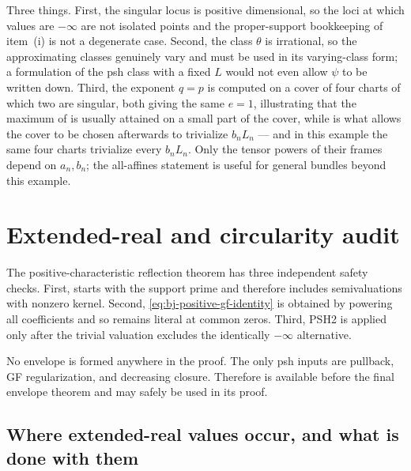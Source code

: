 \begin{remark}
\label{rem:ch43-surface-adds}
Three things.  First, the singular locus is positive dimensional, so the
loci at which values are $-\infty$ are not isolated points and the
proper-support bookkeeping of item~(i) is not a degenerate case.  Second,
the class $\theta$ is irrational, so the approximating classes genuinely
vary and  must be used in its varying-class form; a
formulation of the psh class with a fixed $L$ would not even allow
$\psi$ to be written down.  Third, the exponent $q=p$ is computed on a
cover of four charts of which two are singular, both giving the same
$e=1$, illustrating that the
maximum of  is usually attained on a small
part of the cover, while  is what allows
the cover to be chosen afterwards to trivialize $b_nL_n$ --- and in
this example the same four charts trivialize every $b_nL_n$.
Only the tensor powers of their frames depend on $a_n,b_n$;
the all-affines statement is useful for general bundles beyond this example.
\end{remark}

\section{Extended-real and circularity audit}
\label{sec:ch43-audit}

The positive-characteristic reflection theorem has three independent safety
checks.
First,  starts with the support
prime and therefore includes semivaluations with nonzero kernel.
Second, \eqref{eq:bj-positive-gf-identity} is obtained by powering all
coefficients and so remains literal at common zeros.
Third, PSH2 is applied only after the trivial valuation excludes the
identically $-\infty$ alternative.

No envelope is formed anywhere in the proof.
The only psh inputs are pullback, GF regularization, and decreasing closure.
Therefore  is available before the
final envelope theorem and may safely be used in its proof.

\subsection{Where extended-real values occur, and what is done with them}
\label{sec:ch43-extended-real}

